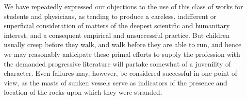 We have repeatedly expressed our objections to the use of this class
of works for students and physicians, as tending to produce a careless,
indifferent or superficial consideration of matters of the deepest scientific
and humanitary interest, and a consequent empirical and unsuccessful
practice. But children usually creep before they walk, and walk
before they are able to run, and hence we may reasonably anticipate
these primal efforts to supply the profession with the demanded progressive
literature will partake somewhat of a juvenility of character.
Even failures may, however, be considered successful in one point of
view, as the masts of sunken vessels serve as indicators of the presence
and location of the rocks upon which they were stranded.\endinput
